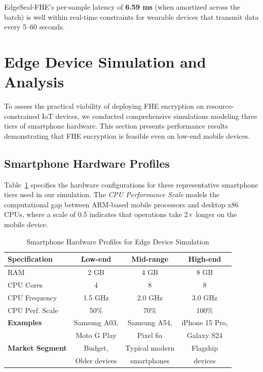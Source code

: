 EdgeSeal-FHE's per-sample latency of \textbf{6.59 ms} (when amortized across the batch) is well within real-time constraints for wearable devices that transmit data every 5--60 seconds.

\section{Edge Device Simulation and Analysis}
\label{sec:edge-device-simulation}

To assess the practical viability of deploying FHE encryption on resource-constrained IoT devices, we conducted comprehensive simulations modeling three tiers of smartphone hardware. This section presents performance results demonstrating that FHE encryption is feasible even on low-end mobile devices.

\subsection{Smartphone Hardware Profiles}

Table~\ref{tab:device-profiles} specifies the hardware configurations for three representative smartphone tiers used in our simulation. The \textit{CPU Performance Scale} models the computational gap between ARM-based mobile processors and desktop x86 CPUs, where a scale of 0.5 indicates that operations take 2$\times$ longer on the mobile device.

\begin{table}[!t]
\caption{Smartphone Hardware Profiles for Edge Device Simulation}
\label{tab:device-profiles}
\centering
\small
\begin{tabular}{|l|c|c|c|}
\hline
\textbf{Specification} & \textbf{Low-end} & \textbf{Mid-range} & \textbf{High-end} \\
\hline
RAM & 2 GB & 4 GB & 8 GB \\
\hline
CPU Cores & 4 & 8 & 8 \\
\hline
CPU Frequency & 1.5 GHz & 2.0 GHz & 3.0 GHz \\
\hline
CPU Perf. Scale & 50\% & 70\% & 100\% \\
\hline
\textbf{Examples} & Samsung A03, & Samsung A54, & iPhone 15 Pro, \\
& Moto G Play & Pixel 6a & Galaxy S24 \\
\hline
\textbf{Market Segment} & Budget, & Typical modern & Flagship \\
& Older devices & smartphones & devices \\
\hline
\end{tabular}
\end{table}

